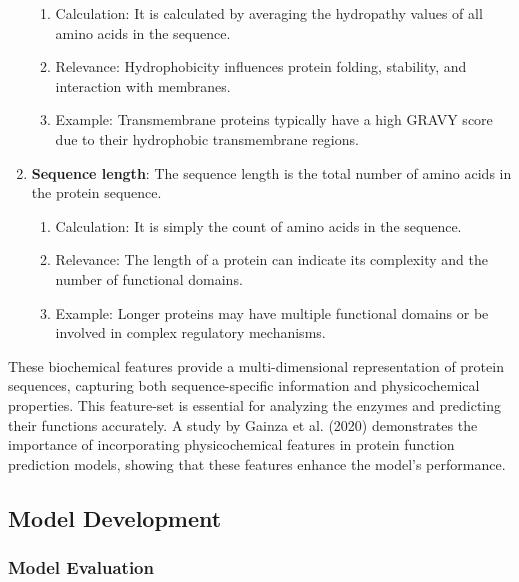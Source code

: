 \begin{enumerate}
    \begin{enumerate}
        \item Calculation: It is calculated by averaging the hydropathy values of all amino acids in the sequence.
        \item Relevance: Hydrophobicity influences protein folding, stability, and interaction with membranes.
        \item Example: Transmembrane proteins typically have a high GRAVY score due to their hydrophobic transmembrane regions.
    \end{enumerate}
    \item \textbf{Sequence length}: The sequence length is the total number of amino acids in the protein sequence.
    \begin{enumerate}
        \item Calculation: It is simply the count of amino acids in the sequence.
        \item Relevance: The length of a protein can indicate its complexity and the number of functional domains.
        \item Example: Longer proteins may have multiple functional domains or be involved in complex regulatory mechanisms.
    \end{enumerate}
\end{enumerate}

These biochemical features provide a multi-dimensional representation of protein sequences, capturing both sequence-specific information and physicochemical properties. This feature-set is essential for analyzing the enzymes and predicting their functions accurately. A study by Gainza et al. (2020) demonstrates the importance of incorporating physicochemical features in protein function prediction models, showing that these features enhance the model's performance. \autocite{gainzaDecipheringInteractionFingerprints2020}
\subsection{Model Development}
\label{sec:Model Development}


\subsubsection{Model Evaluation}
\label{sec:Model Evaluation}